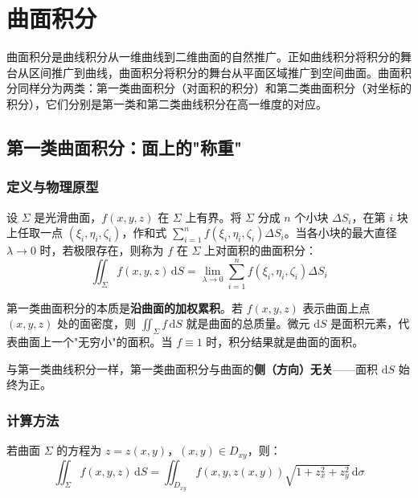 
\section{曲面积分}

曲面积分是曲线积分从一维曲线到二维曲面的自然推广。正如曲线积分将积分的舞台从区间推广到曲线，曲面积分将积分的舞台从平面区域推广到空间曲面。曲面积分同样分为两类：第一类曲面积分（对面积的积分）和第二类曲面积分（对坐标的积分），它们分别是第一类和第二类曲线积分在高一维度的对应。

\subsection{第一类曲面积分：面上的"称重"}

\subsubsection{定义与物理原型}

设 $\Sigma$ 是光滑曲面，$f(x,y,z)$ 在 $\Sigma$ 上有界。将 $\Sigma$ 分成 $n$ 个小块 $\Delta S_i$，在第 $i$ 块上任取一点 $(\xi_i,\eta_i,\zeta_i)$，作和式 $\sum_{i=1}^n f(\xi_i,\eta_i,\zeta_i)\Delta S_i$。当各小块的最大直径 $\lambda\to 0$ 时，若极限存在，则称为 $f$ 在 $\Sigma$ 上对面积的曲面积分：
\[
\iint_\Sigma f(x,y,z)\,\mathrm{d}S = \lim_{\lambda\to 0}\sum_{i=1}^n f(\xi_i,\eta_i,\zeta_i)\Delta S_i
\]

\begin{essencebox}
第一类曲面积分的本质是\textbf{沿曲面的加权累积}。若 $f(x,y,z)$ 表示曲面上点 $(x,y,z)$ 处的面密度，则 $\iint_\Sigma f\,\mathrm{d}S$ 就是曲面的总质量。微元 $\mathrm{d}S$ 是面积元素，代表曲面上一个"无穷小"的面积。当 $f\equiv 1$ 时，积分结果就是曲面的面积。

与第一类曲线积分一样，第一类曲面积分与曲面的\textbf{侧（方向）无关}——面积 $\mathrm{d}S$ 始终为正。
\end{essencebox}

\subsubsection{计算方法}

若曲面 $\Sigma$ 的方程为 $z=z(x,y)$，$(x,y)\in D_{xy}$，则：
\[
\iint_\Sigma f(x,y,z)\,\mathrm{d}S = \iint_{D_{xy}} f(x,y,z(x,y))\sqrt{1+z_x^2+z_y^2}\,\mathrm{d}\sigma
\]

